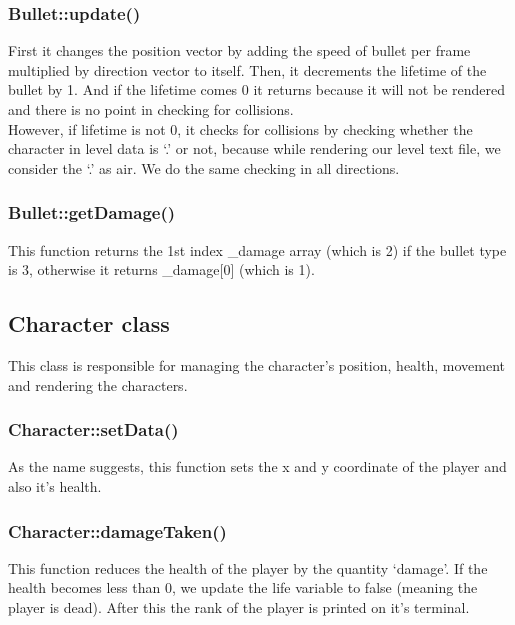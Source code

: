 \documentclass{article}
\begin{document}
\subsubsection{Bullet::update()}
First it changes the position vector by adding the speed of bullet per frame multiplied by direction vector to itself. Then, it decrements the lifetime of the bullet by 1. And if the lifetime comes 0 it returns because it will not be rendered and there is no point in checking for collisions.\\

However, if lifetime is not 0, it checks for collisions by checking whether the character in level data is ‘.’ or not, because while rendering our level text file, we consider the ‘.’ as air. We do the same checking in all directions. \\
\newline

\subsubsection{Bullet::getDamage()}
This function returns the 1st index \_damage array (which is 2) if the bullet type is 3, otherwise it returns \_damage[0] (which is 1).
\newline

\subsection{Character class}
This class is responsible for managing the character’s position, health, movement and rendering the characters.
 \\
 
\subsubsection{Character::setData()}
As the name suggests, this function sets the x and y coordinate of the player and also it’s health.
\newline

\subsubsection{Character::damageTaken()}
This function reduces the health of the player by the quantity ‘damage’. If the health becomes less than 0, we update the life variable to false (meaning the player is dead). After this the rank of the player is printed on it’s terminal. 
\newline
\end{document}
